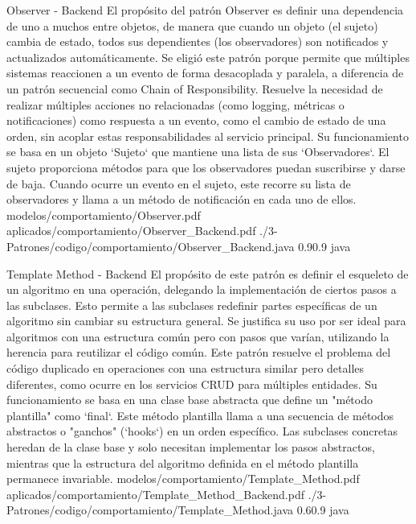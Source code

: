 \Patron
    {Observer - Backend}
    {El propósito del patrón Observer es definir una dependencia de uno a muchos entre objetos, de manera que cuando un objeto (el sujeto) cambia de estado, todos sus dependientes (los observadores) son notificados y actualizados automáticamente. Se eligió este patrón porque permite que múltiples sistemas reaccionen a un evento de forma desacoplada y paralela, a diferencia de un patrón secuencial como Chain of Responsibility.}
    {Resuelve la necesidad de realizar múltiples acciones no relacionadas (como logging, métricas o notificaciones) como respuesta a un evento, como el cambio de estado de una orden, sin acoplar estas responsabilidades al servicio principal. Su funcionamiento se basa en un objeto `Sujeto` que mantiene una lista de sus `Observadores`. El sujeto proporciona métodos para que los observadores puedan suscribirse y darse de baja. Cuando ocurre un evento en el sujeto, este recorre su lista de observadores y llama a un método de notificación en cada uno de ellos.}
    {modelos/comportamiento/Observer.pdf}
    {aplicados/comportamiento/Observer_Backend.pdf}
    {./3-Patrones/codigo/comportamiento/Observer_Backend.java}
    {0.9}{0.9}
    {java}
\newpage

\Patron
    {Template Method - Backend}
    {El propósito de este patrón es definir el esqueleto de un algoritmo en una operación, delegando la implementación de ciertos pasos a las subclases. Esto permite a las subclases redefinir partes específicas de un algoritmo sin cambiar su estructura general. Se justifica su uso por ser ideal para algoritmos con una estructura común pero con pasos que varían, utilizando la herencia para reutilizar el código común.}
    {Este patrón resuelve el problema del código duplicado en operaciones con una estructura similar pero detalles diferentes, como ocurre en los servicios CRUD para múltiples entidades. Su funcionamiento se basa en una clase base abstracta que define un "método plantilla" como `final`. Este método plantilla llama a una secuencia de métodos abstractos o "ganchos" (`hooks`) en un orden específico. Las subclases concretas heredan de la clase base y solo necesitan implementar los pasos abstractos, mientras que la estructura del algoritmo definida en el método plantilla permanece invariable.}
    {modelos/comportamiento/Template_Method.pdf}
    {aplicados/comportamiento/Template_Method_Backend.pdf}
    {./3-Patrones/codigo/comportamiento/Template_Method.java}
    {0.6}{0.9}
    {java}
\newpage

